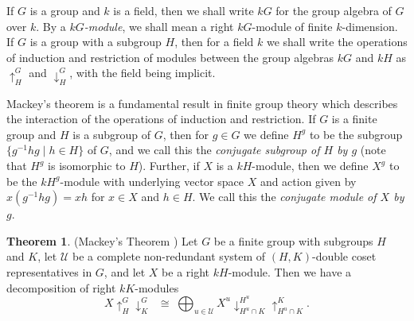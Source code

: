\documentclass[10pt]{article}
\theoremstyle{definition}
\newtheorem{theo}[theorem]{Theorem}
\begin{document}
If $G$ is a group and $k$ is a field, then we shall write $kG$ for the group algebra of $G$ over $k$. By a \textit{$kG$-module}, we shall
mean a right $kG$-module of finite $k$-dimension.
If $G$ is a group with a subgroup $H$, then for a field $k$ we shall write the operations of induction and restriction of modules
between the group algebras $kG$ and $kH$ as $\uparrow^{G}_{H}$ and $\downarrow^{G}_{H}$, with the field being implicit.

Mackey's theorem is a fundamental result in finite group theory which describes the interaction of the operations of induction and
restriction. If $G$ is a finite group and $H$ is a subgroup of $G$, then for $g \in G$ we define $H^g$ to be the subgroup
$\{g^{-1}hg \mid h \in H\}$ of $G$, and we call this the \textit{conjugate subgroup of $H$ by $g$} (note that $H^g$ is isomorphic to $H$).
Further, if $X$ is a $kH$-module, then we define $X^g$ to be the $kH^g$-module with underlying vector space $X$ and action given by
$x(g^{-1}hg) = xh$ for $x \in X$ and $h \in H$. We call this the \textit{conjugate module of $X$ by $g$}.

\begin{theo}\label{mackey:thm}\textup{(}Mackey's Theorem \cite[Theorem 3.3.4]{BRCI}\textup{)}
Let $G$ be a finite group with subgroups $H$ and $K$, let $\mathcal{U}$ be a complete non-redundant system of $(H,K)$-double coset
representatives in $G$, and let $X$ be a right $kH$-module. Then we have a decomposition of right $kK$-modules
\[
X\!\uparrow^{G}_{H}\downarrow^{G}_{K} \;\;\cong\;
\bigoplus_{u \in \mathcal{U}} X^u\downarrow^{H^u}_{H^u\cap K}\uparrow^{K}_{H^u\cap K}.
\]
\end{theo}
\end{document}
